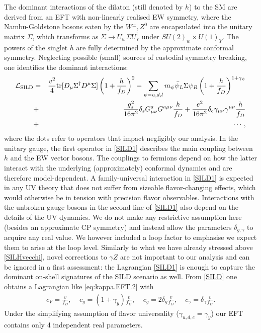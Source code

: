 The dominant interactions of the dilaton (still denoted by $h$) to the SM are derived from an EFT with non-linearly realised EW symmetry, where the Nambu-Goldstone bosons eaten by the $W^\pm,Z^0$ are encapsulated into the unitary matrix $\Sigma$, which transforms as $\Sigma\to U_w\Sigma U_Y^\dagger$ under $SU(2)_w\times U(1)_Y$. The powers of the singlet $h$ are fully determined by the approximate conformal symmetry. Neglecting possible (small) sources of custodial symmetry breaking, one identifies the dominant interactions:~\cite{Goldberger:2008zz}
\begin{eqnarray}\label{SILD1}
{\cal L}_{\rm SILD}&=&\frac{v^2}{4}{\rm tr}[D_\mu\Sigma^\dagger D^\mu\Sigma]\left(1+\frac{h}{f_D}\right)^2-\sum_{\psi=u,d,l}m_\psi\bar\psi_L\Sigma\psi_R\left(1+\frac{h}{f_D}\right)^{1+\gamma_\psi}\\\nonumber
&+&\frac{g_s^2}{16\pi^2}\delta_sG^a_{\mu\nu}G^{a\mu\nu}\frac{h}{f_D}+\frac{e^2}{16\pi^2}\delta_e\gamma_{\mu\nu}\gamma^{\mu\nu}\frac{h}{f_D}\\\nonumber
&+&\cdots,
\end{eqnarray}
where the dots refer to operators that impact negligibly our analysis. In the unitary gauge, the first operator in \eqref{SILD1} describes the main coupling between $h$ and the EW vector bosons. The couplings to fermions depend on how the latter interact with the underlying (approximately) conformal dynamics and are therefore model-dependent. A family-universal interaction in \eqref{SILD1} is expected in any UV theory that does not suffer from sizeable flavor-changing effects, which would otherwise be in tension with precision flavor observables. Interactions with the unbroken gauge bosons in the second line of \eqref{SILD1} also depend on the details of the UV dynamics. We do not make any restrictive assumption here (besides an approximate CP symmetry) and instead allow the parameters $\delta_{g,\gamma}$ to acquire any real value. We however included a loop factor to emphasise we expect them to arise at the loop level. Similarly to what we have already stressed above \eqref{SILHvecchi}, novel corrections to $\gamma Z$ are not important to our analysis and can be ignored in a first assessment: the Lagrangian \eqref{SILD1} is enough to capture the dominant on-shell signatures of the SILD scenario as well. From \eqref{SILD} one obtains a Lagrangian like \eqref{eq:kappa.EFT.2} with 
\begin{eqnarray}\label{4parSILD}
c_V=\frac{v}{f_D},~~~~~c_y=(1+\gamma_y)\frac{v}{f_D},~~~~~c_g=2\delta_g\frac{v}{f_D},~~~~~c_\gamma=\delta_\gamma\frac{v}{f_D}.
\end{eqnarray}
Under the simplifying assumption of flavor universality ($\gamma_{u,d,e}=\gamma_y$) our EFT contains only 4 independent real parameters. %


